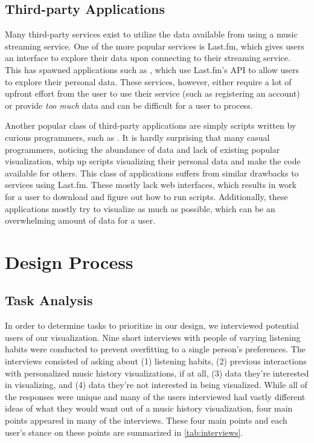 \documentclass[journal]{vgtc}                %
\begin{document}
\subsection{Third-party Applications}

Many third-party services exist to utilize the data available from using a music streaming service. One of the more popular services is Last.fm, which gives users an interface to explore their data upon connecting to their streaming service. This has spawned applications such as \cite{Pre08,Dan12}, which use Last.fm's API to allow users to explore their personal data.
These services, however, either require a lot of upfront effort from the user to use their service (such as registering an account) or provide \emph{too much} data and can be difficult for a user to process.

Another popular class of third-party applications are simply scripts written by curious programmers, such as \cite{Boe16}. It is hardly surprising that many casual programmers, noticing the abundance of data and lack of existing popular visualization, whip up scripts visualizing their personal data and make the code available for others. This class of applications suffers from similar drawbacks to services using Last.fm. These mostly lack web interfaces, which results in work for a user to download and figure out how to run scripts. Additionally, these applications mostly try to visualize as much as possible, which can be an overwhelming amount of data for a user.

\section{Design Process}

\subsection{Task Analysis}

In order to determine tasks to prioritize in our design, we interviewed potential users of our visualization. Nine short interviews with people of varying listening habits were conducted to prevent overfitting to a single person's preferences. The interviews consisted of asking about (1) listening habits, (2) previous interactions with personalized music history visualizations, if at all, (3) data they're interested in visualizing, and (4) data they're not interested in being visualized. While all of the responses were unique and many of the users interviewed had vastly different ideas of what they would want out of a music history visualization, four main points appeared in many of the interviews. These four main points and each user's stance on these points are summarized in \autoref{tab:interviews}.
\end{document}
